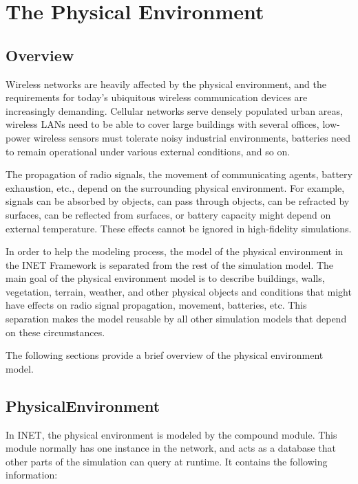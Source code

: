 \chapter{The Physical Environment}
\label{cha:environment}

\section{Overview}

Wireless networks are heavily affected by the physical environment, and the
requirements for today's ubiquitous wireless communication devices are
increasingly demanding. Cellular networks serve densely populated urban
areas, wireless LANs need to be able to cover large buildings with several
offices, low-power wireless sensors must tolerate noisy industrial
environments, batteries need to remain operational under various external
conditions, and so on.

The propagation of radio signals, the movement of communicating agents,
battery exhaustion, etc., depend on the surrounding physical environment.
For example, signals can be absorbed by objects, can pass through objects,
can be refracted by surfaces, can be reflected from surfaces, or battery
capacity might depend on external temperature. These effects cannot
be ignored in high-fidelity simulations.

In order to help the modeling process, the model of the physical environment in
the INET Framework is separated from the rest of the simulation model. The main
goal of the physical environment model is to describe buildings, walls,
vegetation, terrain, weather, and other physical objects and conditions that
might have effects on radio signal propagation, movement, batteries, etc. This
separation makes the model reusable by all other simulation models that depend
on these circumstances.

The following sections provide a brief overview of the physical environment
model.

\section{PhysicalEnvironment}

In INET, the physical environment is modeled by the
 compound module. This module normally has one
instance in the network, and acts as a database that other parts of the
simulation can query at runtime. It contains the following information:

